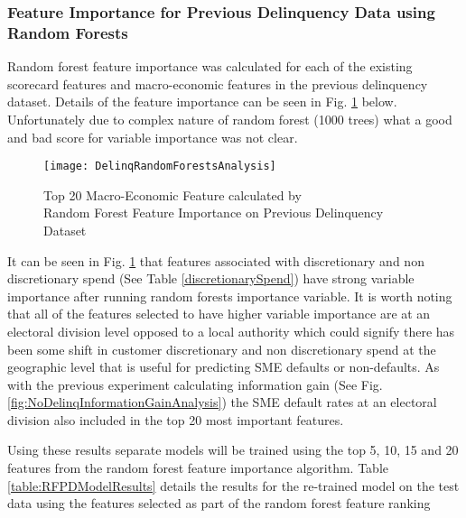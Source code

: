 \subsubsection{Feature Importance for Previous Delinquency Data using Random Forests}\label{RFPDExper}
Random forest feature importance was calculated for
each of the existing scorecard features and macro-economic features in the previous delinquency dataset. Details of the feature importance can be seen in Fig. \ref{fig:DelinqRandomForestsAnalysis} below. Unfortunately due to complex nature of random forest (1000 trees) what a good and bad score for variable importance was not clear.

\begin{figure}[H]
	\texttt{[image: DelinqRandomForestsAnalysis]}
	\caption{Top 20 Macro-Economic Feature calculated by \\
		Random Forest Feature Importance on Previous Delinquency Dataset}
	\label{fig:DelinqRandomForestsAnalysis}
\end{figure}

It can be seen in Fig. \ref{fig:DelinqRandomForestsAnalysis} that features associated with discretionary and non discretionary spend (See Table \ref{discretionarySpend}) have strong variable importance after running random forests importance variable. It is worth noting that all of the features selected to have higher variable importance are at an electoral division level opposed to a local authority which could signify there has been some shift in customer discretionary and non discretionary spend at the geographic level that is useful for predicting SME defaults or non-defaults. As with the previous experiment calculating information gain  (See Fig. \ref{fig:NoDelinqInformationGainAnalysis}) the SME default rates at an electoral division also included in the top 20 most important features.

Using these results separate models will be trained using the top 5, 10, 15 and 20 features from
the random forest feature importance algorithm. Table \ref{table:RFPDModelResults} details the results for the re-trained model
on the test data using the features selected as part of the random forest feature ranking

